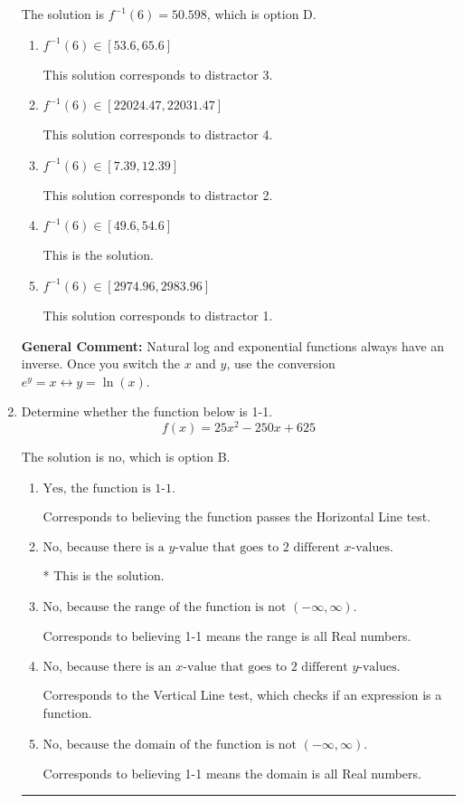 \documentclass{extbook}[14pt]
\newcommand{\litem}[1]{\item #1

\rule{\textwidth}{0.4pt}}
\begin{document}
\begin{enumerate}
{The solution is \( f^{-1}(6) = 50.598 \), which is option D.\begin{enumerate}[label=\Alph*.]
\item \( f^{-1}(6) \in [53.6, 65.6] \)

 This solution corresponds to distractor 3.
\item \( f^{-1}(6) \in [22024.47, 22031.47] \)

 This solution corresponds to distractor 4.
\item \( f^{-1}(6) \in [7.39, 12.39] \)

 This solution corresponds to distractor 2.
\item \( f^{-1}(6) \in [49.6, 54.6] \)

 This is the solution.
\item \( f^{-1}(6) \in [2974.96, 2983.96] \)

 This solution corresponds to distractor 1.
\end{enumerate}

\textbf{General Comment:} Natural log and exponential functions always have an inverse. Once you switch the $x$ and $y$, use the conversion $ e^y = x \leftrightarrow y=\ln(x)$.
}
\litem{
Determine whether the function below is 1-1.
\[ f(x) = 25 x^2 - 250 x + 625 \]

The solution is \( \text{no} \), which is option B.\begin{enumerate}[label=\Alph*.]
\item \( \text{Yes, the function is 1-1.} \)

Corresponds to believing the function passes the Horizontal Line test.
\item \( \text{No, because there is a $y$-value that goes to 2 different $x$-values.} \)

* This is the solution.
\item \( \text{No, because the range of the function is not $(-\infty, \infty)$.} \)

Corresponds to believing 1-1 means the range is all Real numbers.
\item \( \text{No, because there is an $x$-value that goes to 2 different $y$-values.} \)

Corresponds to the Vertical Line test, which checks if an expression is a function.
\item \( \text{No, because the domain of the function is not $(-\infty, \infty)$.} \)

Corresponds to believing 1-1 means the domain is all Real numbers.
\end{enumerate}

}
\end{enumerate}
\end{document}
